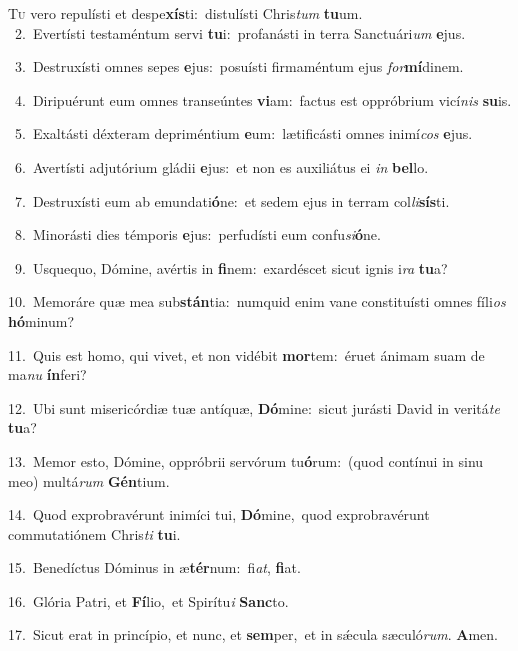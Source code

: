\lettrine{\initial\textcolor{\initialcolor}{T}}{u} vero repulísti et despe\-\textbf{xís}\-ti:~\star distulísti Chris\textit{tum} \textbf{tu}\-um.\\
{\numbfont\textcolor{\numbcolor}{~2.}}~Evertísti testaméntum servi \textbf{tu}\-i:~\star profanásti in terra Sanctuári\textit{um} \textbf{e}\-jus.\par
{\numbfont\textcolor{\numbcolor}{~3.}}~Destruxísti omnes sepes \textbf{e}\-jus:~\star posuísti firmaméntum ejus \textit{for}\-\textbf{mí}dinem.\par
{\numbfont\textcolor{\numbcolor}{~4.}}~Diripuérunt eum omnes transeúntes \textbf{vi}\-am:~\star factus est oppróbrium vicí\textit{nis} \textbf{su}\-is.\par
{\numbfont\textcolor{\numbcolor}{~5.}}~Exaltásti déxteram depriméntium \textbf{e}\-um:~\star lætificásti omnes inimí\textit{cos} \textbf{e}\-jus.\par
{\numbfont\textcolor{\numbcolor}{~6.}}~Avertísti adjutórium gládii \textbf{e}\-jus:~\star et non es auxiliátus ei \textit{in} \textbf{bel}\-lo.\par
{\numbfont\textcolor{\numbcolor}{~7.}}~Destruxísti eum ab emundati\-\textbf{ó}\-ne:~\star et sedem ejus in terram col\-\textit{li}\-\textbf{sís}ti.\par
{\numbfont\textcolor{\numbcolor}{~8.}}~Minorásti dies témporis \textbf{e}\-jus:~\star perfudísti eum confu\-\textit{si}\-\textbf{ó}ne.\par
{\numbfont\textcolor{\numbcolor}{~9.}}~Usquequo, Dómine, avértis in \textbf{fi}\-nem:~\star exardéscet sicut ignis i\textit{ra} \textbf{tu}\-a?\par
{\numbfont\textcolor{\numbcolor}{10.}}~Memoráre quæ mea sub\-\textbf{stán}\-tia:~\star numquid enim vane constituísti omnes fíli\textit{os} \textbf{hó}\-minum?\par
{\numbfont\textcolor{\numbcolor}{11.}}~Quis est homo, qui vivet, et non vidébit \textbf{mor}\-tem:~\star éruet ánimam suam de ma\textit{nu} \textbf{ín}\-feri?\par
{\numbfont\textcolor{\numbcolor}{12.}}~Ubi sunt misericórdiæ tuæ antíquæ, \textbf{Dó}\-mine:~\star sicut jurásti David in veritá\textit{te} \textbf{tu}\-a?\par
{\numbfont\textcolor{\numbcolor}{13.}}~Memor esto, Dómine, oppróbrii servórum tu\-\textbf{ó}\-rum:~\star (quod contínui in sinu meo) multá\textit{rum} \textbf{Gén}\-tium.\par
{\numbfont\textcolor{\numbcolor}{14.}}~Quod exprobravérunt inimíci tui, \textbf{Dó}\-mine,~\star quod exprobravérunt commutatiónem Chris\textit{ti} \textbf{tu}\-i.\par
{\numbfont\textcolor{\numbcolor}{15.}}~Benedíctus Dóminus in æ\-\textbf{tér}\-num:~\star fi\-\textit{at}\-, \textbf{fi}\-at.\par
{\numbfont\textcolor{\numbcolor}{16.}}~Glória Patri, et \textbf{Fí}\-lio,~\star et Spirítu\textit{i} \textbf{Sanc}\-to.\par
{\numbfont\textcolor{\numbcolor}{17.}}~Sicut erat in princípio, et nunc, et \textbf{sem}\-per,~\star et in sǽcula sæculó\-\textit{rum}\-. \textbf{A}\-men.\par
